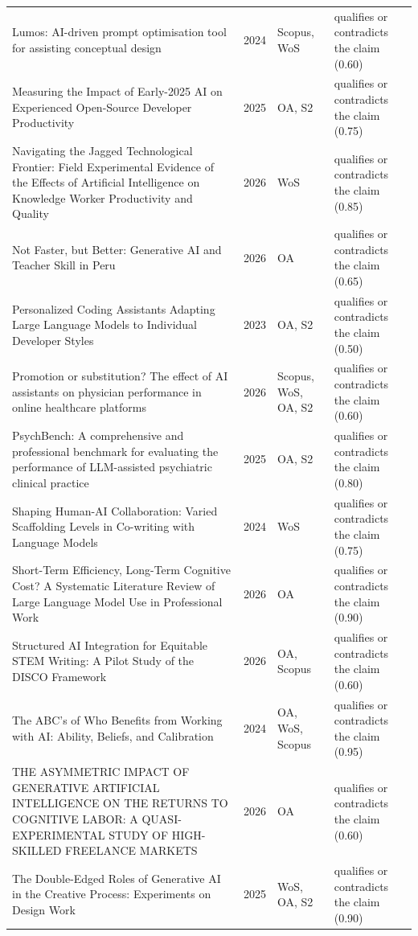 \begin{longtable}{@{}%
  >{\raggedright\arraybackslash}p{}c%
  >{\raggedright\arraybackslash}p{}%
  >{\raggedright\arraybackslash}p{}@{}}
Lumos: AI-driven prompt optimisation tool for assisting conceptual design & 2024 & Scopus, WoS & qualifies or contradicts the claim (0.60) \\
Measuring the Impact of Early-2025 AI on Experienced Open-Source Developer Productivity & 2025 & OA, S2 & qualifies or contradicts the claim (0.75) \\
Navigating the Jagged Technological Frontier: Field Experimental Evidence of the Effects of Artificial Intelligence on Knowledge Worker Productivity and Quality & 2026 & WoS & qualifies or contradicts the claim (0.85) \\
Not Faster, but Better: Generative AI and Teacher Skill in Peru & 2026 & OA & qualifies or contradicts the claim (0.65) \\
Personalized Coding Assistants Adapting Large Language Models to Individual Developer Styles & 2023 & OA, S2 & qualifies or contradicts the claim (0.50) \\
Promotion or substitution? The effect of AI assistants on physician performance in online healthcare platforms & 2026 & Scopus, WoS, OA, S2 & qualifies or contradicts the claim (0.60) \\
PsychBench: A comprehensive and professional benchmark for evaluating the performance of LLM-assisted psychiatric clinical practice & 2025 & OA, S2 & qualifies or contradicts the claim (0.80) \\
Shaping Human-AI Collaboration: Varied Scaffolding Levels in Co-writing with Language Models & 2024 & WoS & qualifies or contradicts the claim (0.75) \\
Short-Term Efficiency, Long-Term Cognitive Cost? A Systematic Literature Review of Large Language Model Use in Professional Work & 2026 & OA & qualifies or contradicts the claim (0.90) \\
Structured AI Integration for Equitable STEM Writing: A Pilot Study of the DISCO Framework & 2026 & OA, Scopus & qualifies or contradicts the claim (0.60) \\
The ABC's of Who Benefits from Working with AI: Ability, Beliefs, and Calibration & 2024 & OA, WoS, Scopus & qualifies or contradicts the claim (0.95) \\
THE ASYMMETRIC IMPACT OF GENERATIVE ARTIFICIAL INTELLIGENCE ON THE RETURNS TO COGNITIVE LABOR: A QUASI-EXPERIMENTAL STUDY OF HIGH-SKILLED FREELANCE MARKETS & 2026 & OA & qualifies or contradicts the claim (0.60) \\
The Double-Edged Roles of Generative AI in the Creative Process: Experiments on Design Work & 2025 & WoS, OA, S2 & qualifies or contradicts the claim (0.90) \\

\end{longtable}
